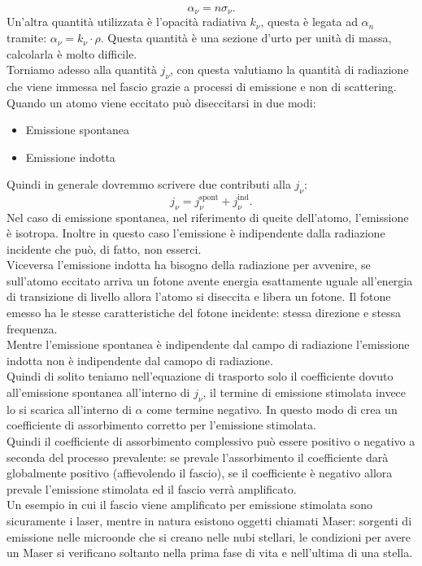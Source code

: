 \[
	\alpha_{\nu} = n \sigma_{\nu}
.\] 
Un'altra quantità utilizzata è l'opacità radiativa $k_{\nu}$, questa è legata ad $\alpha_{n}$ tramite: $\alpha_{\nu}= k_{\nu}\cdot \rho$. Questa quantità è una sezione d'urto per unità di massa, calcolarla è molto difficile.\\
Torniamo adesso alla quantità $j _{\nu} $, con questa valutiamo la quantità di radiazione che viene immessa nel fascio grazie a processi di emissione e non di scattering.\\
Quando un atomo viene eccitato può diseccitarsi in due modi:
\begin{itemize}
	\item Emissione spontanea
	\item Emissione indotta
\end{itemize}
Quindi in generale dovremmo scrivere due contributi alla $j _{\nu} $:
\[
	j _{\nu} = j _{\nu}^{\text{spont}} + j _{\nu}^{\text{ind}}
.\] 
Nel caso di emissione spontanea, nel riferimento di queite dell'atomo, l'emissione è isotropa. Inoltre in questo caso l'emissione è indipendente dalla radiazione incidente che può, di fatto, non esserci.\\
Viceversa l'emissione indotta ha bisogno della radiazione per avvenire, se sull'atomo eccitato arriva un fotone avente energia esattamente uguale all'energia di transizione di livello allora l'atomo si diseccita e libera un fotone. Il fotone emesso ha le stesse caratteristiche del fotone incidente: stessa direzione e stessa frequenza.\\
Mentre l'emissione spontanea è indipendente dal campo di radiazione l'emissione indotta non è indipendente dal camopo di radiazione.\\
Quindi di solito teniamo nell'equazione di trasporto solo il coefficiente dovuto all'emissione spontanea all'interno di $j _{\nu} $, il termine di emissione stimolata invece lo si scarica all'interno di $\alpha $ come termine negativo. In questo modo di crea un coefficiente di assorbimento corretto per l'emissione stimolata.\\
Quindi il coefficiente di assorbimento complessivo può essere positivo o negativo a seconda del processo prevalente: se prevale l'assorbimento il coefficiente darà globalmente positivo (affievolendo il fascio), se il coefficiente è negativo allora prevale l'emissione stimolata ed il fascio verrà amplificato.\\
Un esempio in cui il fascio viene amplificato per emissione stimolata sono sicuramente i laser, mentre in natura esistono oggetti chiamati Maser: sorgenti di emissione nelle microonde che si creano nelle nubi stellari, le condizioni per avere un Maser si verificano soltanto nella prima fase di vita e nell'ultima di una stella.\\
